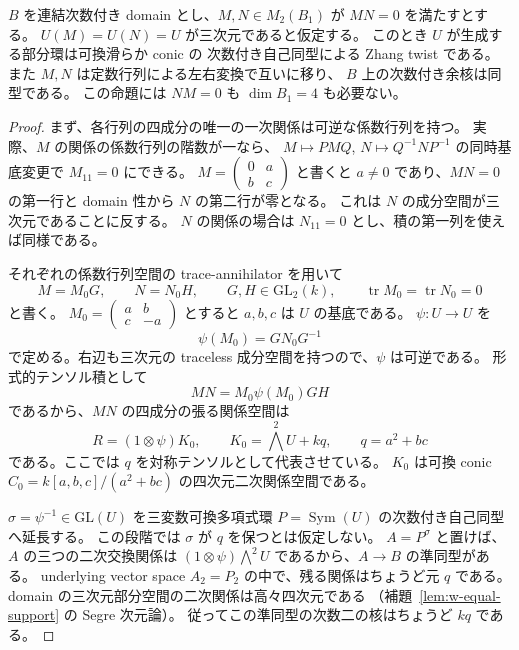 \begin{lemma}
\label{lem:standard-one-support-conic}
$B$ を連結次数付き domain とし、$M,N\in M_2(B_1)$ が $MN=0$ を満たすとする。
$U(M)=U(N)=U$ が三次元であると仮定する。
このとき $U$ が生成する部分環は可換滑らか conic の
次数付き自己同型による Zhang twist である。
また $M,N$ は定数行列による左右変換で互いに移り、
$B$ 上の次数付き余核は同型である。
この命題には $NM=0$ も $\dim B_1=4$ も必要ない。
\end{lemma}
\begin{proof}
まず、各行列の四成分の唯一の一次関係は可逆な係数行列を持つ。
実際、$M$ の関係の係数行列の階数が一なら、
$M\mapsto PMQ$, $N\mapsto Q^{-1}NP^{-1}$ の同時基底変更で
$M_{11}=0$ にできる。
$M=\left(\begin{smallmatrix}0&a\\b&c\end{smallmatrix}\right)$ と書くと
$a\ne0$ であり、$MN=0$ の第一行と domain 性から $N$ の第二行が零となる。
これは $N$ の成分空間が三次元であることに反する。
$N$ の関係の場合は $N_{11}=0$ とし、積の第一列を使えば同様である。

それぞれの係数行列空間の trace-annihilator を用いて
\[
 M=M_0G,\qquad N=N_0H,\qquad G,H\in\mathrm{GL}_2(k),
 \qquad \operatorname{tr}M_0=\operatorname{tr}N_0=0
\]
と書く。
$M_0=\left(\begin{smallmatrix}a&b\\c&-a\end{smallmatrix}\right)$ とすると
$a,b,c$ は $U$ の基底である。
$\psi:U\to U$ を
\[
 \psi(M_0)=G N_0G^{-1}
\]
で定める。右辺も三次元の traceless 成分空間を持つので、$\psi$ は可逆である。
形式的テンソル積として
\[
 MN=M_0\psi(M_0)GH
\]
であるから、$MN$ の四成分の張る関係空間は
\[
 R=(1\otimes\psi)K_0,\qquad
 K_0=\bigwedge^2U+kq,\qquad q=a^2+bc
\]
である。ここでは $q$ を対称テンソルとして代表させている。
$K_0$ は可換 conic $C_0=k[a,b,c]/(a^2+bc)$ の四次元二次関係空間である。

$\sigma=\psi^{-1}\in\mathrm{GL}(U)$ を三変数可換多項式環
$P=\operatorname{Sym}(U)$ の次数付き自己同型へ延長する。
この段階では $\sigma$ が $q$ を保つとは仮定しない。
$A=P^\sigma$ と置けば、$A$ の三つの二次交換関係は
$(1\otimes\psi)\bigwedge^2U$ であるから、$A\to B$ の準同型がある。
underlying vector space $A_2=P_2$ の中で、残る関係はちょうど元 $q$ である。
domain の三次元部分空間の二次関係は高々四次元である
（補題~\ref{lem:w-equal-support} の Segre 次元論）。
従ってこの準同型の次数二の核はちょうど $kq$ である。


\end{proof}
